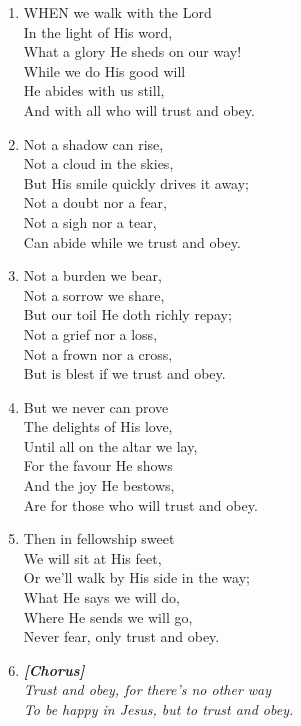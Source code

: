 \begin{enumerate}
    \item WHEN we walk with the Lord \\
        In the light of His word, \\
        What a glory He sheds on our way! \\
        While we do His good will \\
        He abides with us still, \\
        And with all who will trust and obey.

    \item Not a shadow can rise, \\
        Not a cloud in the skies, \\
        But His smile quickly drives it away; \\
        Not a doubt nor a fear, \\
        Not a sigh nor a tear, \\
        Can abide while we trust and obey.

    \item Not a burden we bear, \\
        Not a sorrow we share, \\
        But our toil He doth richly repay; \\
        Not a grief nor a loss, \\
        Not a frown nor a cross, \\
        But is blest if we trust and obey.

    \item But we never can prove \\
        The delights of His love, \\
        Until all on the altar we lay, \\
        For the favour He shows \\
        And the joy He bestows, \\
        Are for those who will trust and obey.

    \item Then in fellowship sweet \\
        We will sit at His feet, \\
        Or we'll walk by His side in the way; \\
        What He says we will do, \\
        Where He sends we will go, \\
        Never fear, only trust and obey.

    \item[] \vspace{0.4em}
    \textbf{\textit{[Chorus]}} \\
    \textit{Trust and obey, for there's no other way} \\
    \textit{To be happy in Jesus, but to trust and obey.}
    \vspace{0.4em}

\end{enumerate}

